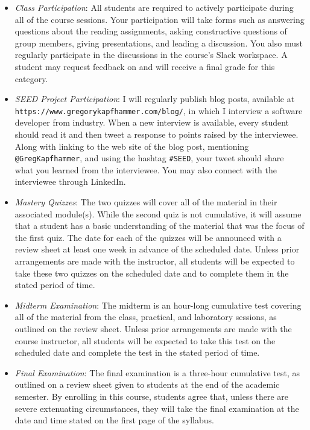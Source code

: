 \documentclass[11pt]{article}
\newcommand{\url}[1]{\lstinline{#1}}
\begin{document}
\begin{itemize}

  \item {\em Class Participation\/}: All students are required to actively
    participate during all of the course sessions. Your participation will take
    forms such as answering questions about the reading assignments, asking
    constructive questions of group members, giving presentations, and leading a
    discussion. You also must regularly participate in the discussions in the
    course's Slack workspace. A student may request feedback on and will receive a
    final grade for this category.

  \item {\em SEED Project Participation\/}: I will regularly publish blog posts,
    available at \url{https://www.gregorykapfhammer.com/blog/}, in which I
    interview a software developer from industry. When a new interview is
    available, every student should read it and then tweet a response to points
    raised by the interviewee. Along with linking to the web site of the blog
    post, mentioning \url{@GregKapfhammer}, and using the hashtag \url{#SEED},
    your tweet should share what you learned from the interviewee. You may also
    connect with the interviewee through LinkedIn.

  \item {\em Mastery Quizzes\/}: The two quizzes will cover all of the material
    in their associated module(s). While the second quiz is not cumulative, it
    will assume that a student has a basic understanding of the material that
    was the focus of the first quiz. The date for each of the quizzes will be
    announced with a review sheet at least one week in advance of the scheduled
    date. Unless prior arrangements are made with the instructor, all students
    will be expected to take these two quizzes on the scheduled date and to
    complete them in the stated period of time.

  \item {\em Midterm Examination\/}: The midterm is an hour-long cumulative test
    covering all of the material from the class, practical, and laboratory
    sessions, as outlined on the review sheet. Unless prior arrangements are
    made with the course instructor, all students will be expected to take this
    test on the scheduled date and complete the test in the stated period of
    time.

  \item {\em Final Examination\/}: The final examination is a three-hour
    cumulative test, as outlined on a review sheet given to students at the end
    of the academic semester. By enrolling in this course, students agree that,
    unless there are severe extenuating circumstances, they will take the final
    examination at the date and time stated on the first page of the syllabus.


\end{itemize}
\end{document}
